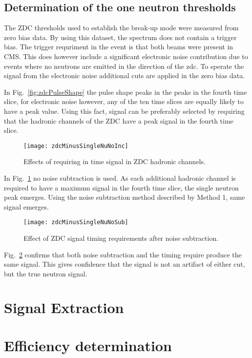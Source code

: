     \subsection{Determination of the one neutron thresholds}
      The ZDC thresholds used to establish the break-up mode were measured from
        zero bias data.
      By using this dataset, the spectrum does not contain a trigger bias. 
      The trigger requriment in the event is that both beams were present in 
        CMS.
      This does however include a significant electronic noise contribution due
        to events where no neutrons are emitted in the direction of the zdc.
      To sperate the signal from the electronic noise additional cuts are 
        applied in the zero bias data.

      In Fig.~\ref{fig:zdcPulseShape} the pulse shape peaks in the peaks in the
        fourth time slice, for electronic noise however, any of the ten time 
        slices are equally likely to have a peak value.
      Using this fact, signal can be preferably selected by requiring that the
        hadronic channels of the ZDC have a peak signal in the fourth time 
        slice.
      \begin{figure}[h]
        \centering
        \texttt{[image: zdcMinusSingleNuNoInc]}
        \caption{Effects of requiring in time signal in ZDC hadronic 
          channels.}
        \label{fig:zdcTimingCuts}
      \end{figure}
      In Fig.~\ref{fig:zdcTimingCuts} no noise subtraction is used. 
      As each additional hadronic channel is required to have a maximum signal
        in the fourth time slice, the single neutron peak emerges. 
      Using the noise subtraction method described by Method 1, same signal 
        emerges.
      \begin{figure}[h]
        \centering
        \texttt{[image: zdcMinusSingleNuNoSub]}
        \caption{Effect of ZDC signal timing requirements after noise 
          subtraction.}
        \label{fig:zdcTimingAfterNoiseSub}
      \end{figure}
      Fig.~\ref{fig:zdcTimingAfterNoiseSub} confirms that both noise 
        subtraction and the timing require produce the same signal.
      This gives confidence that the signal is not an artifact of either cut, 
        but the true neutron signal. 

  \section{Signal Extraction}
  \section{\label{sec:effDet} Efficiency determination}
